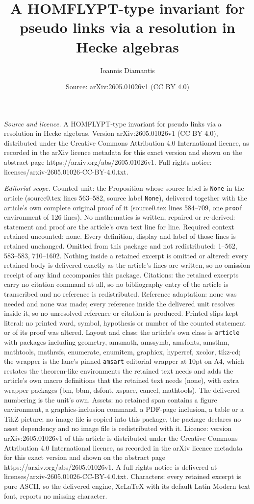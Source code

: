 \documentclass[10pt,a4paper]{amsart}
\title[A HOMFLYPT-type invariant for pseudo links via a resolution ]{A HOMFLYPT-type invariant for pseudo links via a resolution in Hecke algebras}
\author{Ioannis Diamantis}
\date{Source: arXiv:2605.01026v1 (CC BY 4.0)}
\begin{document}
\maketitle

\noindent\emph{Source and licence.} A HOMFLYPT-type invariant for pseudo links via a resolution in Hecke algebras. Version arXiv:2605.01026v1 (CC BY 4.0), distributed under the Creative Commons Attribution 4.0 International licence, as recorded in the arXiv licence metadata for this exact version and shown on the abstract page https://arxiv.org/abs/2605.01026v1. Full rights notice: licenses/arxiv-2605.01026-CC-BY-4.0.txt.\par\smallskip

\noindent\textit{Editorial scope.} Counted unit: the Proposition whose source label is \texttt{None} in the article (source0.tex lines 563--582, source label \texttt{None}), delivered together with the article's own complete original proof of it (source0.tex lines 584--709, one \texttt{proof} environment of 126 lines). No mathematics is written, repaired or re-derived: statement and proof are the article's own text line for line. Required context retained uncounted: none. Every definition, display and label of those lines is retained unchanged. Omitted from this package and not redistributed: 1--562, 583--583, 710--1602. Nothing inside a retained excerpt is omitted or altered: every retained body is delivered exactly as the article's lines are written, so no omission receipt of any kind accompanies this package. Citations: the retained excerpts carry no citation command at all, so no bibliography entry of the article is transcribed and no reference is redistributed. Reference adaptation: none was needed and none was made; every reference inside the delivered unit resolves inside it, so no unresolved reference or citation is produced. Printed slips kept literal: no printed word, symbol, hypothesis or number of the counted statement or of its proof was altered. Layout and class: the article's own class is \texttt{article} with packages including geometry, amsmath, amssymb, amsfonts, amsthm, mathtools, mathrsfs, enumerate, enumitem, graphicx, hyperref, xcolor, tikz-cd; the wrapper is the lane's pinned \texttt{amsart} editorial wrapper at 10pt on A4, which restates the theorem-like environments the retained text needs and adds the article's own macro definitions that the retained text needs (none), with extra wrapper packages (bm, bbm, dsfont, xspace, cancel, mathtools). The delivered numbering is the unit's own. Assets: no retained span contains a figure environment, a graphics-inclusion command, a PDF-page inclusion, a table or a TikZ picture; no image file is copied into this package, the package declares no asset dependency and no image file is redistributed with it. Licence: version arXiv:2605.01026v1 of this article is distributed under the Creative Commons Attribution 4.0 International licence, as recorded in the arXiv licence metadata for this exact version and shown on the abstract page https://arxiv.org/abs/2605.01026v1. A full rights notice is delivered at licenses/arxiv-2605.01026-CC-BY-4.0.txt. Characters: every retained excerpt is pure ASCII, so the delivered engine, XeLaTeX with its default Latin Modern text font, reports no missing character.
\end{document}
